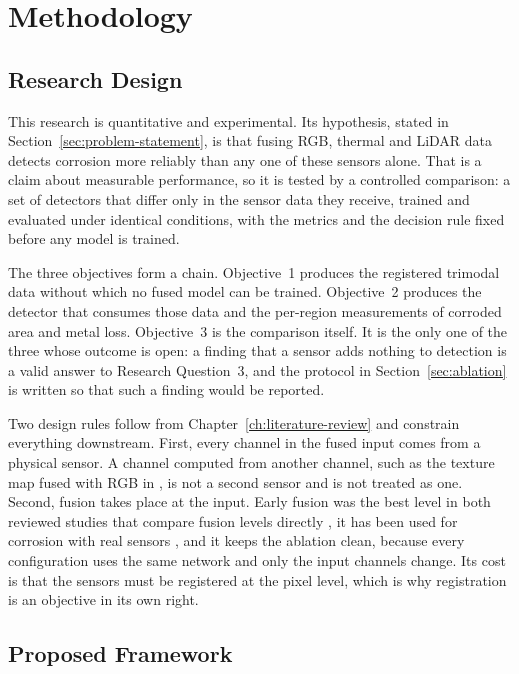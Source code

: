 \chapter[METHODOLOGY]{Methodology}
\label{ch:methodology}

\section{Research Design}
\label{sec:research-design}

This research is quantitative and experimental. Its hypothesis, stated in
Section~\ref{sec:problem-statement}, is that fusing RGB, thermal and LiDAR data
detects corrosion more reliably than any one of these sensors alone. That is a
claim about measurable performance, so it is tested by a controlled comparison:
a set of detectors that differ only in the sensor data they receive, trained and
evaluated under identical conditions, with the metrics and the decision rule
fixed before any model is trained.

The three objectives form a chain. Objective~1 produces the registered trimodal
data without which no fused model can be trained. Objective~2 produces the
detector that consumes those data and the per-region measurements of corroded
area and metal loss. Objective~3 is the comparison itself. It is the only one of
the three whose outcome is open: a finding that a sensor adds nothing to
detection is a valid answer to Research Question~3, and the protocol in
Section~\ref{sec:ablation} is written so that such a finding would be reported.

Two design rules follow from Chapter~\ref{ch:literature-review} and constrain
everything downstream. First, every channel in the fused input comes from a
physical sensor. A channel computed from another channel, such as the texture
map fused with RGB in \citet{Mao2026}, is not a second sensor and is not treated
as one. Second, fusion takes place at the input. Early fusion was the best level
in both reviewed studies that compare fusion levels directly
\citep{Yang2023,Mao2026}, it has been used for corrosion with real sensors
\citep{Lim2021,Maru2025}, and it keeps the ablation clean, because every
configuration uses the same network and only the input channels change. Its
cost is that the sensors must be registered at the pixel level, which is why
registration is an objective in its own right.

\section{Proposed Framework}
\label{sec:framework}

